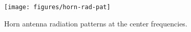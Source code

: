 \documentclass[conference,10pt,a4paper]{IEEEtran}%
\begin{document}


\begin{figure}[tb]
	\centering
	\texttt{[image: figures/horn-rad-pat]}
	\caption{Horn antenna radiation patterns at the center frequencies.}
	\label{fig:rad-pat}
\end{figure}
\end{document}
